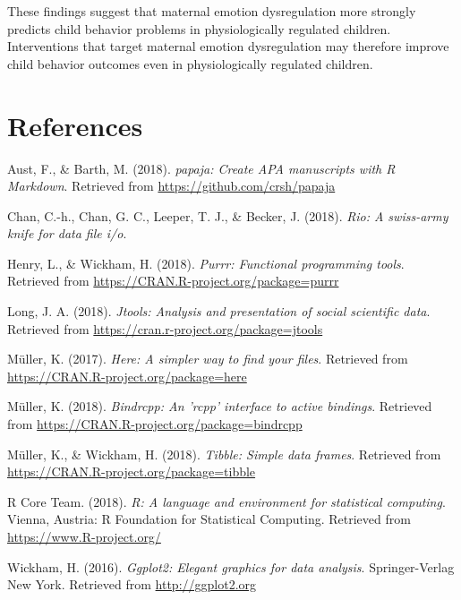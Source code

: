 \documentclass[man]{apa6}
\begin{document}
These findings suggest that maternal emotion dysregulation more strongly
predicts child behavior problems in physiologically regulated children.
Interventions that target maternal emotion dysregulation may therefore
improve child behavior outcomes even in physiologically regulated
children.

\newpage

\section{References}\label{references}

\begingroup
\setlength{\parindent}{-0.5in} \setlength{\leftskip}{0.5in}

\hypertarget{refs}{}
\hypertarget{ref-R-papaja}{}
Aust, F., \& Barth, M. (2018). \emph{papaja: Create APA manuscripts with
R Markdown}. Retrieved from \url{https://github.com/crsh/papaja}

\hypertarget{ref-R-rio}{}
Chan, C.-h., Chan, G. C., Leeper, T. J., \& Becker, J. (2018).
\emph{Rio: A swiss-army knife for data file i/o}.

\hypertarget{ref-R-purrr}{}
Henry, L., \& Wickham, H. (2018). \emph{Purrr: Functional programming
tools}. Retrieved from \url{https://CRAN.R-project.org/package=purrr}

\hypertarget{ref-R-jtools}{}
Long, J. A. (2018). \emph{Jtools: Analysis and presentation of social
scientific data}. Retrieved from
\url{https://cran.r-project.org/package=jtools}

\hypertarget{ref-R-here}{}
Müller, K. (2017). \emph{Here: A simpler way to find your files}.
Retrieved from \url{https://CRAN.R-project.org/package=here}

\hypertarget{ref-R-bindrcpp}{}
Müller, K. (2018). \emph{Bindrcpp: An 'rcpp' interface to active
bindings}. Retrieved from
\url{https://CRAN.R-project.org/package=bindrcpp}

\hypertarget{ref-R-tibble}{}
Müller, K., \& Wickham, H. (2018). \emph{Tibble: Simple data frames}.
Retrieved from \url{https://CRAN.R-project.org/package=tibble}

\hypertarget{ref-R-base}{}
R Core Team. (2018). \emph{R: A language and environment for statistical
computing}. Vienna, Austria: R Foundation for Statistical Computing.
Retrieved from \url{https://www.R-project.org/}

\hypertarget{ref-R-ggplot2}{}
Wickham, H. (2016). \emph{Ggplot2: Elegant graphics for data analysis}.
Springer-Verlag New York. Retrieved from \url{http://ggplot2.org}
\end{document}
